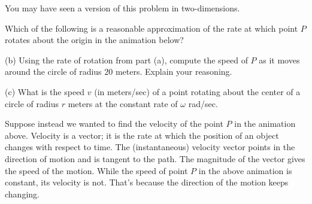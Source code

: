 \documentclass{ximera}
\begin{document}
 
\begin{onlineOnly}
    \begin{center}
\end{center}
\end{onlineOnly}





You may have seen a version of this problem in two-dimensions.


\begin{exploration}  \label{Qdstsdfgf:Cross}

\begin{question}   \label{Qdfg4bk:Cross}
Which of the following is a reasonable approximation of the rate at which point $P$ rotates about the origin in the animation below?
\begin{multipleChoice}  
\end{multipleChoice}  
\end{question}


(b) Using the rate of rotation from part (a), compute the speed of $P$ as it moves around the circle of radius $20$ meters. Explain your reasoning.

(c) What is the speed $v$ (in meters/sec) of a point rotating about the center of a circle of radius $r$ meters at the constant rate of $\omega$ rad/sec.

 
\begin{onlineOnly}
    \begin{center}
\end{center}
\end{onlineOnly}


Suppose instead we wanted to find the velocity of the point $P$ in the animation above. Velocity is a vector; it is the rate at which the position of an object changes with respect to time. The (instantaneous) velocity vector points in the direction of motion and is  tangent to the path. The magnitude of the vector gives the speed of the motion. While the speed of point $P$ in the above animation is constant, its velocity is not. That's because the direction of the motion keeps changing.


\end{exploration}
\end{document}
